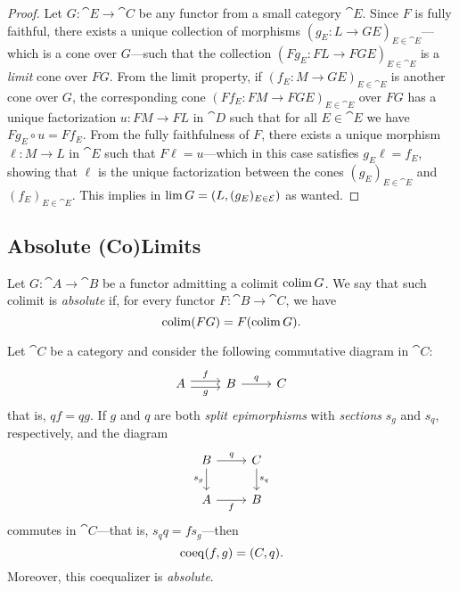 \begin{proof}
Let \(G: \cat E \to \cat C\) be any functor from a small category \(\cat
E\). Since \(F\) is fully faithful, there exists a unique collection of
morphisms \((g_E: L \to G E)_{E \in \cat E}\)---which is a cone over
\(G\)---such that the collection \((F g_E: F L \to F G E)_{E \in \cat E}\) is a
\emph{limit} cone over \(F G\). From the limit property, if
\((f_E: M \to G E)_{E \in \cat E} \) is another cone over \(G\), the
corresponding cone \((F f_E: F M \to F G E)_{E \in \cat E}\) over \(F G\) has a
unique factorization \(u: F M \to F L\) in \(\cat D\) such that for all
\(E \in \cat E\) we have \(F g_E \circ u = F f_E\). From the fully faithfulness
of \(F\), there exists a unique morphism \(\ell: M \to L\) in \(\cat E\) such
that \(F \ell = u\)---which in this case satisfies \(g_E \ell = f_E\), showing
that \(\ell\) is the unique factorization between the cones
\((g_E)_{E \in \cat E}\) and \((f_E)_{E \in \cat E}\). This implies in
\(\operatorname{lim} G = (L, (g_E)_{E \in \mathcal E})\) as wanted.
\end{proof}

\subsection{Absolute (Co)Limits}

\begin{definition}
\label{def:absolute-(co)-limit}
Let \(G: \cat A \to \cat B\) be a functor admitting a colimit \(\operatorname{colim} G\). We
say that such colimit is \emph{absolute} if, for every functor
\(F: \cat B \to \cat C\), we have
\[
\operatorname{colim} (F G) = F (\operatorname{colim} G).
\]
\end{definition}

\begin{proposition}
\label{prop:absolute-coequalizer}
Let \(\cat C\) be a category and consider the following commutative diagram in
\(\cat C\):
\[
\begin{tikzcd}
A \ar[r, shift left, "f"] \ar[r, shift right, "g"']
&B \ar[r, "q"]
&C
\end{tikzcd}
\]
that is, \(q f = q g\). If \(g\) and \(q\) are both \emph{split epimorphisms}
with \emph{sections} \(s_g\) and \(s_q\), respectively, and the diagram
\[
\begin{tikzcd}
B \ar[r, "q"] \ar[d, "s_g"'] &C \ar[d, "s_q"] \\
A \ar[r, "f"'] &B
\end{tikzcd}
\]
commutes in \(\cat C\)---that is, \(s_q q = f s_g\)---then
\[
\operatorname{coeq}(f, g) = (C, q).
\]
Moreover, this coequalizer is \emph{absolute}.
\end{proposition}

